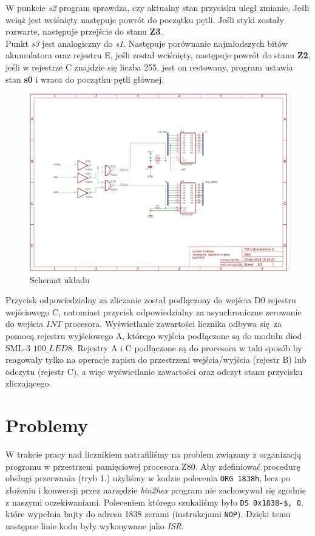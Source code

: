 \documentclass[fleqn]{article}
\begin{document}
W punkcie \textit{s2} program sprawdza, czy aktualny stan przycisku uległ zmianie. Jeśli wciąż jest wciśnięty następuje powrót do początku pętli. Jeśli styki zostały rozwarte, następuje przejście do stanu \textbf{Z3}.\\
Punkt \textit{s3} jest analogiczny do \textit{s1}. Następuje porównanie najmłodszych bitów akumulatora oraz rejestru E, jeśli został wciśnięty, następuje powrót do stanu \textbf{Z2}, jeśli w rejestrze C znajdzie się liczba 255, jest on restowany, program ustawia stan \textbf{s0} i wraca do początku pętli głównej.
\begin{figure}[H]
	\centering
	\includegraphics[width=\textwidth]{img/schematic.pdf}
	\caption{Schemat układu}
	\label{fig:schematic}
\end{figure}


Przycisk odpowiedzialny za zliczanie został podłączony do wejścia D0 rejestru wejściowego C, natomiast przycisk odpowiedzialny za asynchroniczne zerowanie do wejścia $\overline{INT}$ procesora.
Wyświetlanie zawartości licznika odbywa się za pomocą rejestru wyjściowego A, którego wyjścia podłączone są do modułu diod SML-3 $\textit{100\_LED8}$. Rejestry A i C podłączone są do procesora w taki sposób by reagowały tylko na operacje zapisu do przestrzeni wejścia/wyjścia (rejestr B) lub odczytu (rejestr C), a więc wyświetlanie zawartości oraz odczyt stanu przycisku zliczającego.


\section{Problemy}
W trakcie pracy nad licznikiem natrafiliśmy na problem związany z organizacją programu w przestrzeni pamięciowej procesora Z80. Aby zdefiniować procedurę obsługi przerwania (tryb 1.) użyliśmy w kodzie polecenia \lstinline|ORG 1838h|, lecz po złożeniu i konwersji przez narzędzie \textit{bin2hex} program nie zachowywał się zgodnie z naszymi oczekiwaniami. Poleceniem którego szukaliśmy było \lstinline|DS 0x1838-$, 0|, które wypełnia bajty do adresu 1838 zerami (instrukcjami \lstinline|NOP|). Dzięki temu następne linie kodu były wykonywane jako \textit{ISR}.
\end{document}
